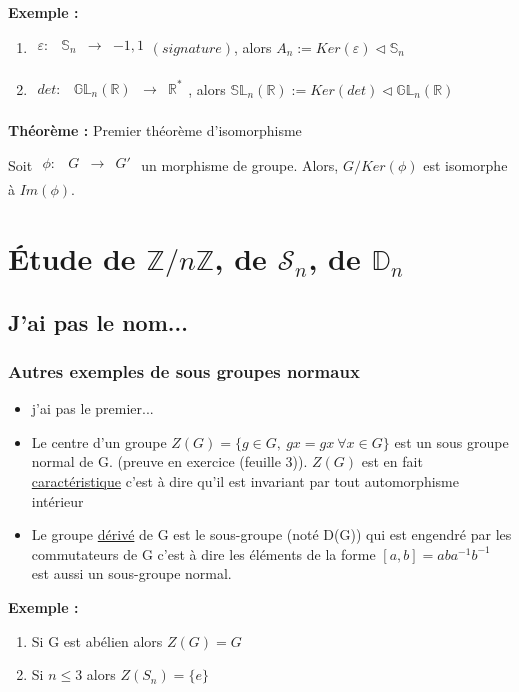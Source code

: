 \documentclass{report}
\newenvironment{exemple}{\begin{tcolorbox}[colframe= white]
    \textbf{Exemple :}
     \par}
    {\end{tcolorbox}}
\newenvironment{theoreme}[1][]{
    \begin{tcolorbox}[]
    \textbf{Théorème :} #1  \par} 
    {\end{tcolorbox}}
\newcommand{\fctsarg}[3]{
    \begin{array}{lrcl}
    #1: & #2 & \longrightarrow & #3 \\
    \end{array}
}
\newcommand{\Z}{\mathbb{Z}}
\newcommand{\R}{\mathbb{R}}
\newcommand{\znz}{\Z/n\Z}
\newcommand{\sn}{\mathcal{S}_{n}}
\newcommand{\dsp}{\displaystyle}
\begin{document}
\begin{exemple}
    \begin{enumerate}
        \item $\fctsarg{\varepsilon}{\mathbb{S}_n}{-1,1} (signature)$, alors $A_n := Ker(\varepsilon) \triangleleft \mathbb{S}_n$
        \item $\fctsarg{det}{\mathbb{GL}_n(\R)}{\R^*}$, alors $\mathbb{SL}_n(\R) := Ker(det) \triangleleft \mathbb{GL}_n(\R)$
    \end{enumerate}
\end{exemple}

\begin{theoreme}[Premier théorème d'isomorphisme]
    Soit $\fctsarg{\phi}{G}{G'}$ un morphisme de groupe. Alors, $G/Ker(\phi)$ est isomorphe à $Im(\phi)$.
\end{theoreme}

\chapter{\texorpdfstring{Étude de $\znz$, de $\sn$, de $\mathbb{D}_{n}$}{Etude de Z/nZ, Sn, Dn}}

\section{J'ai pas le nom...}




\subsection{Autres exemples de sous groupes normaux}

\begin{itemize}
\item j'ai pas le premier...
\item Le centre d'un groupe $\dsp Z(G)=\{g\in G,~gx=gx~\forall x\in G\}$ est un sous groupe normal de G. (preuve en exercice (feuille 3)). $Z(G)$ est en fait \underline{caractéristique} c'est à dire qu'il est invariant par tout automorphisme intérieur
\item Le groupe \underline{dérivé} de G est le sous-groupe (noté D(G)) qui est engendré par les commutateurs de G c'est à dire les éléments de la forme $[a,b]=aba^{-1}b^{-1}$ est aussi un sous-groupe normal.
\end{itemize}

\begin{exemple}
    \begin{enumerate}
        \item Si G est abélien alors $Z(G)=G$
        \item Si $n\leq3$ alors $Z(S_{n})=\{e\}$
    \end{enumerate}
\end{exemple}
\end{document}

